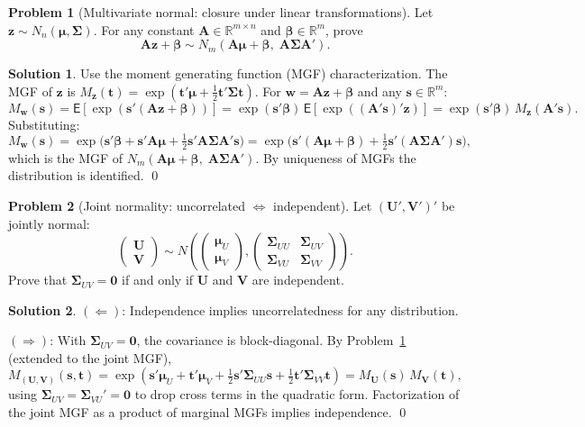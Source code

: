 \documentclass[12pt,a4paper]{article}
\theoremstyle{definition}
\newtheorem{exercise}{Problem}
\newtheorem*{solution*}{Solution}
\newcommand\expc{\mathsf{E}}
\def\bb{\boldsymbol{\beta}}
\newcommand{\bzero}{\mathbf{0}}
\newcommand{\bz}{\mathbf{z}}
\newcommand{\bA}{\mathbf{A}}
\newcommand{\bw}{\mathbf{w}}
\newcommand{\bs}{\mathbf{s}}
\newcommand{\bt}{\mathbf{t}}
\newcommand{\Real}{\mathbb{R}}
\begin{document}
\begin{exercise}[Multivariate normal: closure under linear transformations]\label{prob:A10}
Let $\bz \sim N_n(\boldsymbol\mu, \boldsymbol\Sigma)$. For any constant $\bA \in \Real^{m\times n}$ and $\bb \in \Real^m$, prove
\[
\bA\bz + \bb \sim N_m(\bA\boldsymbol\mu + \bb,\;\bA\boldsymbol\Sigma\bA').
\]
\end{exercise}

\begin{solution*}
Use the moment generating function (MGF) characterization. The MGF of $\bz$ is $M_{\bz}(\bt) = \exp(\bt'\boldsymbol\mu + \tfrac12\bt'\boldsymbol\Sigma\bt)$. For $\bw = \bA\bz + \bb$ and any $\bs \in \Real^m$:
\[
M_{\bw}(\bs) = \expc[\exp(\bs'(\bA\bz+\bb))] = \exp(\bs'\bb)\,\expc[\exp((\bA'\bs)'\bz)] = \exp(\bs'\bb)\,M_{\bz}(\bA'\bs).
\]
Substituting:
\[
M_{\bw}(\bs) = \exp\bigl(\bs'\bb + \bs'\bA\boldsymbol\mu + \tfrac12\bs'\bA\boldsymbol\Sigma\bA'\bs\bigr) = \exp\bigl(\bs'(\bA\boldsymbol\mu+\bb) + \tfrac12\bs'(\bA\boldsymbol\Sigma\bA')\bs\bigr),
\]
which is the MGF of $N_m(\bA\boldsymbol\mu + \bb,\;\bA\boldsymbol\Sigma\bA')$. By uniqueness of MGFs the distribution is identified. \qed
\end{solution*}

\begin{exercise}[Joint normality: uncorrelated $\Leftrightarrow$ independent]\label{prob:A11}
Let $(\mathbf{U}', \mathbf{V}')'$ be jointly normal:
\[
\begin{pmatrix} \mathbf{U} \\ \mathbf{V} \end{pmatrix} \sim N\!\left(\begin{pmatrix} \boldsymbol\mu_U \\ \boldsymbol\mu_V \end{pmatrix}, \begin{pmatrix} \boldsymbol\Sigma_{UU} & \boldsymbol\Sigma_{UV} \\ \boldsymbol\Sigma_{VU} & \boldsymbol\Sigma_{VV} \end{pmatrix}\right).
\]
Prove that $\boldsymbol\Sigma_{UV} = \bzero$ if and only if $\mathbf{U}$ and $\mathbf{V}$ are independent.
\end{exercise}

\begin{solution*}
$(\Leftarrow)$: Independence implies uncorrelatedness for any distribution.

$(\Rightarrow)$: With $\boldsymbol\Sigma_{UV} = \bzero$, the covariance is block-diagonal. By Problem~\ref{prob:A10} (extended to the joint MGF),
\[
M_{(\mathbf{U},\mathbf{V})}(\bs, \bt) = \exp\!\left(\bs'\boldsymbol\mu_U + \bt'\boldsymbol\mu_V + \tfrac{1}{2}\bs'\boldsymbol\Sigma_{UU}\bs + \tfrac{1}{2}\bt'\boldsymbol\Sigma_{VV}\bt\right) = M_{\mathbf{U}}(\bs)\,M_{\mathbf{V}}(\bt),
\]
using $\boldsymbol\Sigma_{UV} = \boldsymbol\Sigma_{VU}' = \bzero$ to drop cross terms in the quadratic form. Factorization of the joint MGF as a product of marginal MGFs implies independence. \qed
\end{solution*}
\end{document}
